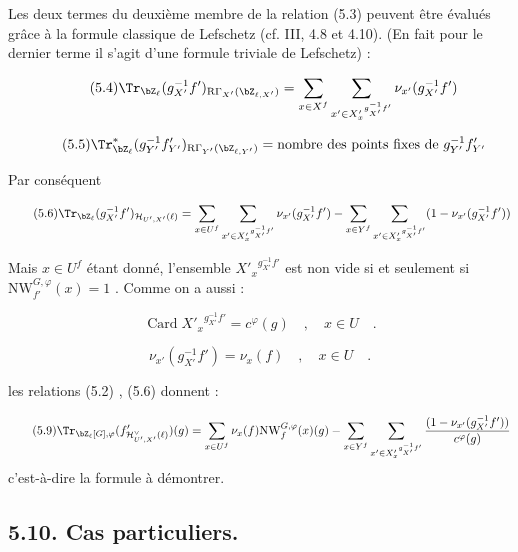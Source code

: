 Les deux termes du deuxième membre de la relation (5.3) peuvent être évalués grâce à la formule classique de Lefschetz (cf. III, 4.8 et 4.10). (En fait pour le dernier terme il s'agit d'une formule triviale de Lefschetz) :

\begin{equation}\tag{5.4}
\Tr_{\bZ_\ell}(g_{X'}^{-1}f')_{\mathrm{R}\Gamma_{X'}(\bZ_{\ell,X'})} = \sum_{x \in X^f} \sum_{x' \in {X'_x}^{g_{X'}^{-1}f'}} \nu_{x'}(g_{X'}^{-1}f')
\end{equation}

\begin{equation}\tag{5.5}
\Tr^*_{\bZ_\ell}(g_{Y'}^{-1}f'_{Y'})_{\mathrm{R}\Gamma_{Y'}(\bZ_{\ell,Y'})} = \text{nombre des points fixes de } g_{Y'}^{-1}f'_{Y'}
\end{equation}

Par conséquent

\begin{equation}\tag{5.6}
\Tr_{\bZ_\ell}(g_{X'}^{-1}f')_{\mathcal{H}_{U',X'}(\ell)} = \sum_{x \in U^f} \sum_{x' \in {X'_x}^{g_{X'}^{-1}f'}} \nu_{x'}(g_{X'}^{-1}f') - \sum_{x \in Y^f} \sum_{x' \in {X'_x}^{g_{X'}^{-1}f'}} (1 - \nu_{x'}(g_{X'}^{-1}f'))
\end{equation}

Mais $x \in U^f$ étant donné, l'ensemble ${X'_x}^{g_{X'}^{-1}f'}$ est non vide si et seulement si $\mathrm{NW}_{f'}^{G,\varphi}(x) = 1$ . Comme on a aussi :

\begin{equation}\tag{5.7}
\operatorname{Card} {X'_x}^{g_{X'}^{-1}f'} = c^\varphi(g) \quad , \quad x \in U \quad .
\end{equation}

\begin{equation}\tag{5.8}
\nu_{x'}(g_{X'}^{-1}f') = \nu_x(f) \quad , \quad x \in U \quad .
\end{equation}

les relations (5.2) , (5.6) donnent :

\begin{equation}\tag{5.9}
\Tr_{\bZ_\ell[G],\varphi}(f'_{\mathcal{H}^\vee_{U',X'}(\ell)})(g) = \sum_{x \in U^f} \nu_x(f) \mathrm{NW}_f^{G,\varphi}(x)(g) - \sum_{x \in Y^f} \sum_{x' \in {X'_x}^{g_{X'}^{-1}f'}} \frac{(1 - \nu_{x'}(g_{X'}^{-1}f'))}{c^\varphi(g)}
\end{equation}
c'est-à-dire la formule à démontrer.

\subsection*{5.10. Cas particuliers.}
